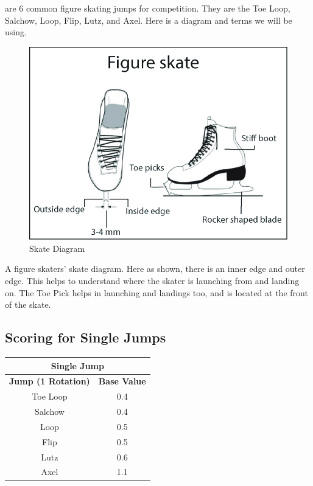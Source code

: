 \documentclass[12pt,journal,compsoc]{IEEEtran}
\begin{document}
 are 6 common figure skating jumps for competition. They are the Toe Loop, Salchow, Loop, Flip, Lutz, and Axel. 
Here is a diagram and terms we will be using. 
\begin{figure}[h]
	\centering
	\includegraphics[scale=.25]{Skate_Diagram.PNG}
	\caption{Skate Diagram}
	\label{Fig:Skate_Diagram}
\end{figure}

A figure skaters' skate diagram. Here as shown, there is an inner edge and outer edge. This helps to understand where the skater is launching from and landing on. The Toe Pick helps in launching and landings too, and is located at the front of the skate. 
\subsection{Scoring for Single Jumps}
\begin{center}
  \begin{tabular}{|c|c|}
  \hline
  \multicolumn{2}{|c|}{Single Jump} \\
    \hline
    \textbf{Jump (1 Rotation)} & \textbf{Base Value}\\
    \hline
    Toe Loop & 0.4\\
    \hline
    Salchow & 0.4\\
    \hline
    Loop & 0.5\\
    \hline
    Flip & 0.5\\
    \hline
    Lutz & 0.6\\
    \hline
    Axel & 1.1\\
    \hline
  \end{tabular}
\end{center}
\end{document}
